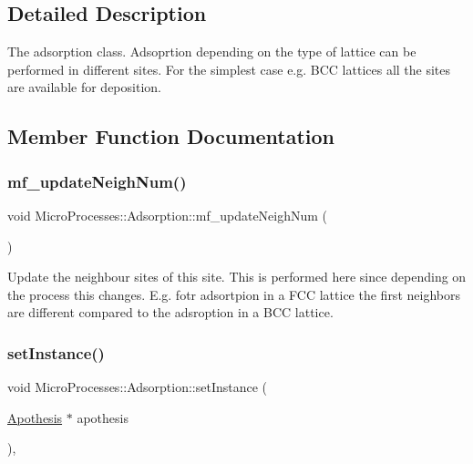 \subsection{Detailed Description}
The adsorption class. Adsoprtion depending on the type of lattice can be performed in different sites. For the simplest case e.\+g. B\+CC lattices all the sites are available for deposition. 

\subsection{Member Function Documentation}
\mbox{\label{classMicroProcesses_1_1Adsorption_a21cf31bffb1e123fb683c6f0c76b8717}} 
\subsubsection{\texorpdfstring{mf\+\_\+update\+Neigh\+Num()}{mf\_updateNeighNum()}}
{\footnotesize\ttfamily void Micro\+Processes\+::\+Adsorption\+::mf\+\_\+update\+Neigh\+Num (\begin{DoxyParamCaption}{ }\end{DoxyParamCaption})\hspace{0.3cm}{\ttfamily [protected]}}

Update the neighbour sites of this site. This is performed here since depending on the process this changes. E.\+g. fotr adsortpion in a F\+CC lattice the first neighbors are different compared to the adsroption in a B\+CC lattice. \mbox{\label{classMicroProcesses_1_1Adsorption_a5faf57ecabf9d2de92d4e630593771d3}} 
\subsubsection{\texorpdfstring{set\+Instance()}{setInstance()}}
{\footnotesize\ttfamily void Micro\+Processes\+::\+Adsorption\+::set\+Instance (\begin{DoxyParamCaption}\item[{\mbox{\hyperlink{classApothesis}{Apothesis}} $\ast$}]{apothesis }\end{DoxyParamCaption})\hspace{0.3cm}{\ttfamily [inline]}, {\ttfamily [virtual]}}

